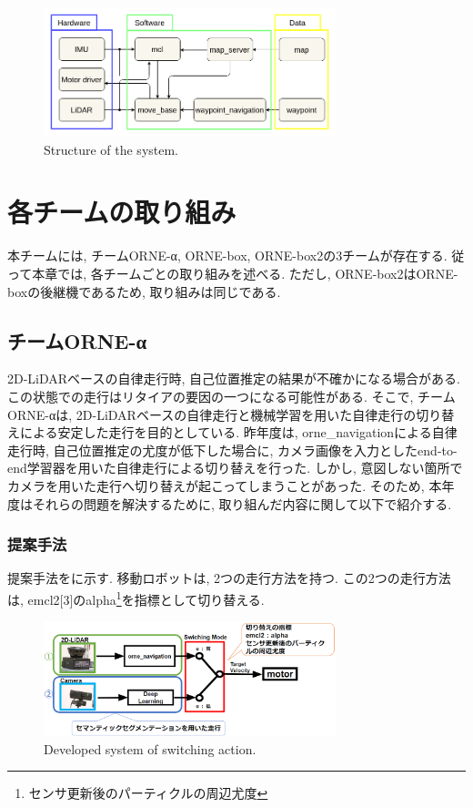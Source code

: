 \documentclass[uplatex, twocolumn, 9pt]{jsproceedings}
\begin{document}
\begin{figure}[h]
  \centering
  \includegraphics[width=85mm]{fig/software.pdf}
  \caption{Structure of the system.}
  \label{fig:soft-fig}%
\end{figure}

\section{各チームの取り組み}
本チームには, チームORNE-α, ORNE-box, ORNE-box2の3チームが存在する. 従って本章では, 各チームごとの取り組みを述べる. ただし, ORNE-box2はORNE-boxの後継機であるため, 取り組みは同じである.

\subsection{チームORNE-α}
2D-LiDARベースの自律走行時, 自己位置推定の結果が不確かになる場合がある. この状態での走行はリタイアの要因の一つになる可能性がある. そこで, チームORNE-αは, 2D-LiDARベースの自律走行と機械学習を用いた自律走行の切り替えによる安定した走行を目的としている. 昨年度は, orne\_navigationによる自律走行時, 自己位置推定の尤度が低下した場合に, カメラ画像を入力としたend-to-end学習器を用いた自律走行による切り替えを行った. しかし, 意図しない箇所でカメラを用いた走行へ切り替えが起こってしまうことがあった. そのため, 本年度はそれらの問題を解決するために, 取り組んだ内容に関して以下で紹介する. 

\subsubsection{提案手法}
提案手法をに示す. 移動ロボットは, 2つの走行方法を持つ. この2つの走行方法は, emcl2[3]のalpha\footnote[1]{センサ更新後のパーティクルの周辺尤度}を指標として切り替える.

\begin{figure}[h]
  \centering
  \includegraphics[width=85mm]{fig/kirikae.pdf}
  \caption{Developed system of switching action.}
  \label{fig:kirikae}%
\end{figure}
\end{document}
